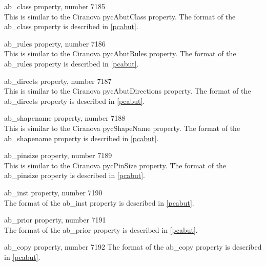 \begin{description}
\item{\et ab\_class} property, number 7185\\
This is similar to the Ciranova {\vt pycAbutClass} property.
The format of the {\et ab\_class} property is described in \ref{pcabut}.

\item{\et ab\_rules} property, number 7186\\
This is similar to the Ciranova {\vt pycAbutRules} property.
The format of the {\et ab\_rules} property is described in \ref{pcabut}.

\item{\et ab\_directs} property, number 7187\\
This is similar to the Ciranova {\vt pycAbutDirections} property.
The format of the {\et ab\_directs} property is described in \ref{pcabut}.

\item{\et ab\_shapename} property, number 7188\\
This is similar to the Ciranova {\vt pycShapeName} property.
The format of the {\et ab\_shapename} property is described in \ref{pcabut}.

\item{\et ab\_pinsize} property, number 7189\\
This is similar to the Ciranova {\vt pycPinSize} property.
The format of the {\et ab\_pinsize} property is described in \ref{pcabut}.

\item{\et ab\_inst} property, number 7190\\
The format of the {\et ab\_inst} property is described in \ref{pcabut}.

\item{\et ab\_prior} property, number 7191\\
The format of the {\et ab\_prior} property is described in \ref{pcabut}.

\item{\et ab\_copy} property, number 7192
The format of the {\et ab\_copy} property is described in \ref{pcabut}.
\end{description}

